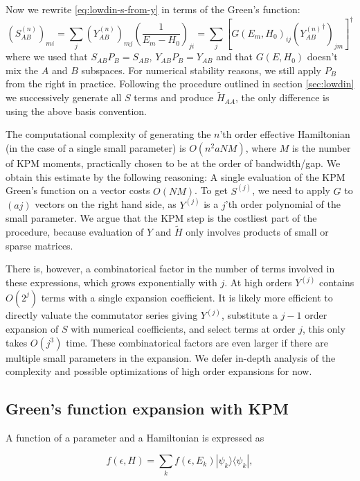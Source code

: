 \documentclass[10pt, onecolumn, aps, prb, superscriptaddress, floatfix, showpacs, notitlepage]{revtex4-1}
\newcommand{\bra}[1]{\langle #1|}
\newcommand{\ket}[1]{|#1\rangle}
\begin{document}
Now we rewrite \eqref{eq:lowdin-s-from-y} in terms of the Green's function:
\begin{equation}
\left(S^{(n)}_{AB}\right)_{mi} =\sum_j \left(Y^{(n)}_{AB}\right)_{mj} \left(\frac{1}{E_m - H_0}\right)_{ji} = \sum_j \left[G(E_m, H_0)_{ij} \left({Y^{(n)}_{AB}}^{\dagger} \right)_{jm}\right]^{\dagger}
\end{equation}
where we used that $S_{AB} P_B = S_{AB}$, $Y_{AB} P_B = Y_{AB}$ and that $G(E, H_0)$ doesn't mix the $A$ and $B$ subspaces.
For numerical stability reasons, we still apply $P_B$ from the right in practice.
Following the procedure outlined in section \ref{sec:lowdin} we successively generate all $S$ terms and produce $\tilde{H}_{AA}$, the only difference is using the above basis convention.

The computational complexity of generating the $n$'th order effective Hamiltonian (in the case of a single small parameter) is $O(n^2 a N M)$, where $M$ is the number of KPM moments, practically chosen to be at the order of bandwidth/gap.
We obtain this estimate by the following reasoning: A single evaluation of the KPM Green's function on a vector costs $O(NM)$. To get $S^{(j)}$, we need to apply $G$ to $(a j)$ vectors on the right hand side, as $Y^{(j)}$ is a $j$'th order polynomial of the small parameter.
We argue that the KPM step is the costliest part of the procedure, because evaluation of $Y$ and $\tilde{H}$ only involves products of small or sparse matrices.

There is, however, a combinatorical factor in the number of terms involved in these expressions, which grows exponentially with $j$.
At high orders $Y^{(j)}$ contains $O(2^j)$ terms with a single expansion coefficient.
It is likely more efficient to directly valuate the commutator series giving $Y^{(j)}$, substitute a $j-1$ order expansion of $S$ with numerical coefficients, and select terms at order $j$, this only takes $O(j^3)$ time.
These combinatorical factors are even larger if there are multiple small parameters in the expansion.
We defer in-depth analysis of the complexity and possible optimizations of high order expansions for now.

\subsection{Green's function expansion with KPM}

A function of a parameter and a Hamiltonian is expressed as

$$
f(\epsilon, H) = \sum_k f(\epsilon, E_k) \ket{\psi_k}\bra{\psi_k},
$$
\end{document}
